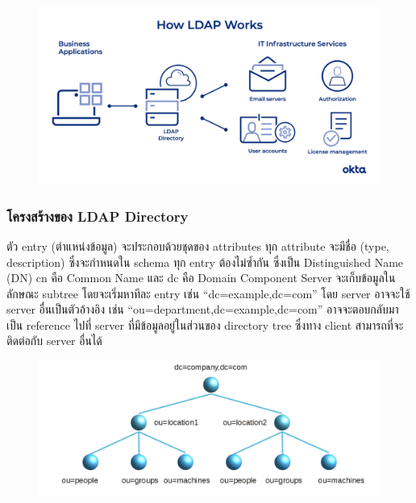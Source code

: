 \begin{figure}[!thb]
	\captionsetup{justification=centering}
	\centering
	\includegraphics[width=6in]{latex/figures/ldap.png}
	\label{fig:ldap}
\end{figure}
\newpage

\subsubsection{โครงสร้างของ LDAP Directory}
ตัว entry (ตำแหน่งข้อมูล) จะประกอบด้วยชุดของ attributes ทุก attribute จะมีชื่อ (type, description) ซึ่งจะกำหนดใน schema ทุก entry ต้องไม่ซ้ำกัน ซึ่งเป็น Distinguished Name (DN) cn คือ Common Name และ dc คือ Domain Component Server จะเก็บข้อมูลในลักษณะ subtree โดยจะเริ่มหาทีละ entry เช่น “dc=example,dc=com” โดย server อาจจะใช้ server อื่นเป็นตัวอ้างอิง เช่น “ou=department,dc=example,dc=com” อาจจะตอบกลับมาเป็น reference ไปที่ server ที่มีข้อมูลอยู่ในส่วนของ directory tree ซึ่งทาง client สามารถที่จะติดต่อกับ server อื่นได้
\begin{figure}[!thb]
    \captionsetup{justification=centering}
    \centering
    \includegraphics[width=5in]{latex/figures/ldap-structure.png}
    \label{fig:ldap-structure}
\end{figure}
\newpage

